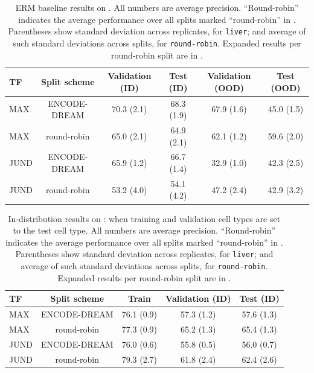 \begin{table}[t]
  \caption{ERM baseline results on \Encode.
  All numbers are average precision.
  ``Round-robin'' indicates the average performance over all splits marked ``round-robin'' in .
  Parentheses show standard deviation across replicates, for \texttt{liver}; and average of such standard deviations across splits, for \texttt{round-robin}.
  Expanded results per round-robin split are in .
  }
  \label{tab:results_roundrobin}
  \begin{center}
  \begin{small}
  \begin{tabular}{lccccc}
  \toprule
  TF & Split scheme & Validation (ID) & Test (ID) & Validation (OOD) & Test (OOD) \\
  \midrule
  MAX &  ENCODE-DREAM  &   70.3 (2.1)  &   68.3 (1.9) & 67.9 (1.6) & 45.0 (1.5)   \\
  MAX &  round-robin  &  65.0 (2.1)  & 64.9 (2.1)  & 62.1 (1.2)  & 59.6 (2.0) \\
  \midrule
  JUND &  ENCODE-DREAM  &   65.9 (1.2)  &  66.7 (1.4)  & 32.9 (1.0) & 42.3 (2.5) \\
  JUND &  round-robin  & 53.2 (4.0)  & 54.1 (4.2)  & 47.2 (2.4)  & 42.9 (3.2)  \\
  \bottomrule
  \end{tabular}
  \end{small}
  \end{center}
  \vspace{-4mm}
\end{table}


\begin{table}[t]
  \caption{In-distribution results on \Encode: when training and validation cell types are set to the test cell type.
  All numbers are average precision.
  ``Round-robin'' indicates the average performance over all splits marked ``round-robin'' in .
  Parentheses show standard deviation across replicates, for \texttt{liver}; and average of such standard deviations across splits, for \texttt{round-robin}.
  Expanded results per round-robin split are in .
  }
  \label{tab:results_etwilds_id}
  \begin{center}
  \begin{small}
  \begin{tabular}{lcccc}
  \toprule
  TF & Split scheme & Train & Validation (ID) & Test (ID) \\
  \midrule
  MAX &  ENCODE-DREAM  & 76.1 (0.9)  &  57.3 (1.2)  &  57.6 (1.3)  \\
  MAX &  round-robin  &  77.3 (0.9)  &  65.2 (1.3)  &  65.4 (1.3)  \\
  \midrule
  JUND &  ENCODE-DREAM  &   76.0 (0.6)  &  55.8 (0.5)  &  56.0 (0.7) \\
  JUND &  round-robin  &  79.3 (2.7)  &  61.8 (2.4)  &  62.4 (2.6)  \\
  \bottomrule
  \end{tabular}
  \end{small}
  \end{center}
  \vspace{-4mm}
\end{table}

